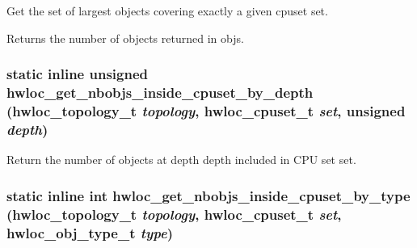 Get the set of largest objects covering exactly a given cpuset {\ttfamily set}. \begin{DoxyReturn}{Returns}
the number of objects returned in {\ttfamily objs}. 
\end{DoxyReturn}
\hypertarget{group__hwlocality__helper__find__inside_gace5af1ea003c8269566b6726fade7b32}{
\subsubsection[{hwloc\_\-get\_\-nbobjs\_\-inside\_\-cpuset\_\-by\_\-depth}]{\setlength{\rightskip}{0pt plus 5cm}static inline unsigned hwloc\_\-get\_\-nbobjs\_\-inside\_\-cpuset\_\-by\_\-depth ({\bf hwloc\_\-topology\_\-t} {\em topology}, \/  {\bf hwloc\_\-cpuset\_\-t} {\em set}, \/  unsigned {\em depth})}}
\label{group__hwlocality__helper__find__inside_gace5af1ea003c8269566b6726fade7b32}


Return the number of objects at depth {\ttfamily depth} included in CPU set {\ttfamily set}. \hypertarget{group__hwlocality__helper__find__inside_ga7e44cec58c6bdb681400a52d007d2597}{
\subsubsection[{hwloc\_\-get\_\-nbobjs\_\-inside\_\-cpuset\_\-by\_\-type}]{\setlength{\rightskip}{0pt plus 5cm}static inline int hwloc\_\-get\_\-nbobjs\_\-inside\_\-cpuset\_\-by\_\-type ({\bf hwloc\_\-topology\_\-t} {\em topology}, \/  {\bf hwloc\_\-cpuset\_\-t} {\em set}, \/  {\bf hwloc\_\-obj\_\-type\_\-t} {\em type})}}
\label{group__hwlocality__helper__find__inside_ga7e44cec58c6bdb681400a52d007d2597}


